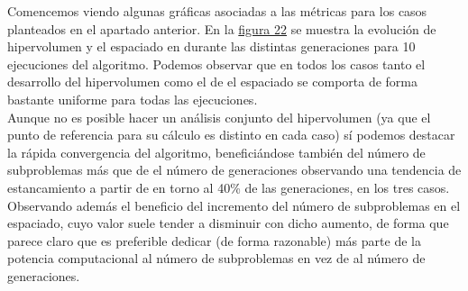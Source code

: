 Comencemos viendo algunas gráficas asociadas a las métricas para los casos planteados en el apartado anterior. En la \hyperref[fig:22]{figura 22} se muestra la evolución de hipervolumen y el espaciado en durante las distintas generaciones para 10 ejecuciones del algoritmo. Podemos observar que en todos los casos tanto el desarrollo del hipervolumen como el de el espaciado se comporta de forma bastante uniforme para todas las ejecuciones.\\

Aunque no es posible hacer un análisis conjunto del hipervolumen (ya que el punto de referencia para su cálculo es distinto en cada caso) sí podemos destacar la rápida convergencia del algoritmo, beneficiándose también del número de subproblemas más que de el número de generaciones observando una tendencia de estancamiento a partir de en torno al 40\% de las generaciones, en los tres casos. Observando además el beneficio del incremento del número de subproblemas en el espaciado, cuyo valor suele tender a disminuir con dicho aumento, de forma que parece claro que es preferible dedicar (de forma razonable) más parte de la potencia computacional al número de subproblemas en vez de al número de generaciones. \\

